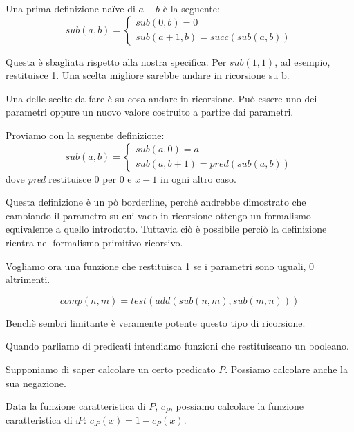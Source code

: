 Una prima definizione naïve di $a - b$ è la seguente:
\begin{equation*}
    \textit{sub}(a,b) =
    \begin{cases}
        \textit{sub}(0,b) = 0 \\
        \textit{sub}(a+1,b) = \textit{succ}(\textit{sub}(a,b))
    \end{cases}
\end{equation*}

Questa è sbagliata rispetto alla nostra specifica. Per $sub(1,1)$, ad esempio, restituisce 1. Una
scelta migliore sarebbe andare in ricorsione su b.

Una delle scelte da fare è su cosa andare in ricorsione. Può essere uno dei parametri oppure un
nuovo valore costruito a partire dai parametri.

Proviamo con la seguente definizione:
\begin{equation*}
    \textit{sub}(a,b) =
    \begin{cases}
        \textit{sub}(a,0) = a \\
        \textit{sub}(a,b+1) = \textit{pred}(\textit{sub}(a,b))
    \end{cases}
\end{equation*}
dove \textit{pred} restituisce 0 per 0 e $x-1$ in ogni altro caso.

Questa definizione è un pò borderline, perché andrebbe dimostrato che cambiando il parametro su
cui vado in ricorsione ottengo un formalismo equivalente a quello introdotto. Tuttavia ciò è
possibile perciò la definizione rientra nel formalismo primitivo ricorsivo.

Vogliamo ora una funzione che restituisca 1 se i parametri sono uguali, 0 altrimenti.

\begin{equation*}
    \textit{comp}(n,m) = test(\textit{add}(\textit{sub}(n,m),\textit{sub}(m,n)))
\end{equation*}

Benchè sembri limitante è veramente potente questo tipo di ricorsione.

Quando parliamo di predicati intendiamo funzioni che restituiscano un booleano.

Supponiamo di saper calcolare un certo predicato $P$. Possiamo calcolare anche la sua negazione.

Data la funzione caratteristica di $P$, $c_{P}$, possiamo calcolare la funzione caratteristica di
$\comp{P}$: $c_{\comp{P}}(x) = 1 - c_{P}(x)$.

